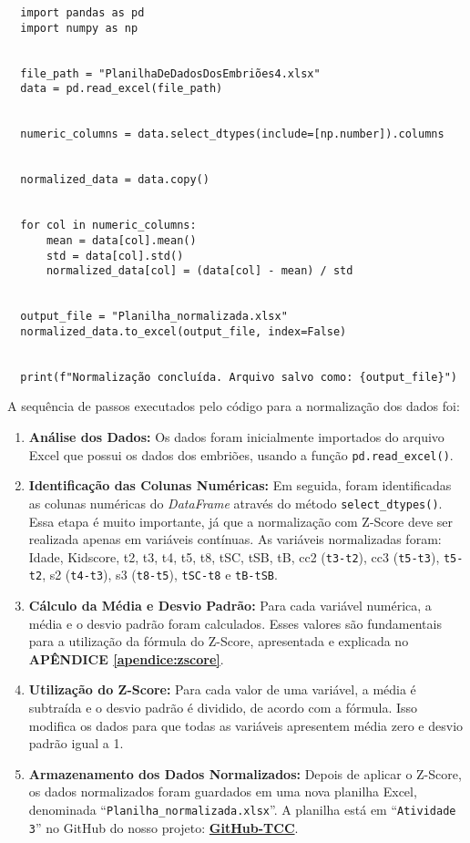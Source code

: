 \begin{lstlisting}
  import pandas as pd
  import numpy as np
  
  
  file_path = "PlanilhaDeDadosDosEmbriões4.xlsx"  
  data = pd.read_excel(file_path)
  
  
  numeric_columns = data.select_dtypes(include=[np.number]).columns
  
  
  normalized_data = data.copy()
  
  
  for col in numeric_columns:
      mean = data[col].mean()
      std = data[col].std()
      normalized_data[col] = (data[col] - mean) / std
  
  
  output_file = "Planilha_normalizada.xlsx"
  normalized_data.to_excel(output_file, index=False)
  
  
  print(f"Normalização concluída. Arquivo salvo como: {output_file}")
\end{lstlisting}  

A sequência de passos executados pelo código para a normalização dos dados foi:

\begin{enumerate}
    \item \textbf{Análise dos Dados:} Os dados foram inicialmente importados do arquivo Excel que possui os dados dos embriões, usando a função \texttt{pd.read\_excel()}.
    
    \item \textbf{Identificação das Colunas Numéricas:} Em seguida, foram identificadas as colunas numéricas do \textit{DataFrame} através do método \texttt{select\_dtypes()}. Essa etapa é muito importante, já que a normalização com Z-Score deve ser realizada apenas em variáveis contínuas. As variáveis normalizadas foram: Idade, Kidscore, t2, t3, t4, t5, t8, tSC, tSB, tB, cc2 (\texttt{t3-t2}), cc3 (\texttt{t5-t3}), \texttt{t5-t2}, s2 (\texttt{t4-t3}), s3 (\texttt{t8-t5}), \texttt{tSC-t8} e \texttt{tB-tSB}.
    
    \item \textbf{Cálculo da Média e Desvio Padrão:} Para cada variável numérica, a média e o desvio padrão foram calculados. Esses valores são fundamentais para a utilização da fórmula do Z-Score, apresentada e explicada no \textbf{APÊNDICE \ref{apendice:zscore}}.
    
    \item \textbf{Utilização do Z-Score:} Para cada valor de uma variável, a média é subtraída e o desvio padrão é dividido, de acordo com a fórmula. Isso modifica os dados para que todas as variáveis apresentem média zero e desvio padrão igual a 1.
    
    \item \textbf{Armazenamento dos Dados Normalizados:} Depois de aplicar o Z-Score, os dados normalizados foram guardados em uma nova planilha Excel, denominada “\texttt{Planilha\_normalizada.xlsx}”. A planilha está em “\texttt{Atividade 3}” no GitHub do nosso projeto: \textbf{\href{https://github.com/sabrinaberno/TCC1}{GitHub-TCC}}.
\end{enumerate}

